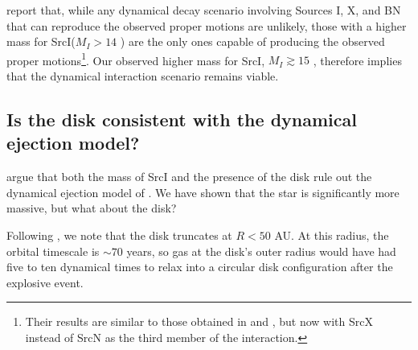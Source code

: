 \documentclass[twocolumn]{aastex61}
\newcommand{\sourcei}{SrcI\xspace}
\newcommand{\sourcen}{SrcN\xspace}
\newcommand{\sourcex}{SrcX\xspace}
\begin{document}
\citet{Farias2017b} report that, while any dynamical decay scenario involving
Sources I, X, and BN that can reproduce the observed proper motions are
unlikely, those with a higher mass for \sourcei ($M_I>14$ \msun) are the only
ones capable of producing the observed proper motions\footnote{Their results
are similar to those obtained in \citet{Goddi2011b} and \citet{Moeckel2012b},
but now with \sourcex instead of \sourcen as the third member of the
interaction.}.  Our observed higher mass for \sourcei, $M_I\gtrsim15$ \msun,
therefore implies that the
dynamical interaction scenario remains viable.



\subsection{Is the disk consistent with the dynamical ejection model?}
\citet{Plambeck2016a} argue that both the mass of \sourcei and the presence of
the disk rule out the dynamical ejection model of \citet{Bally2011a}.  We have
shown that the star is significantly more massive, but what about the disk?

Following \citet{Bally2011a}, we note that the disk truncates at $R<50$
AU.  At this radius, the orbital timescale is $\sim70$ years, so gas at the
disk's outer radius would have had five to ten dynamical times to relax into a
circular disk configuration after the explosive event.
\end{document}
